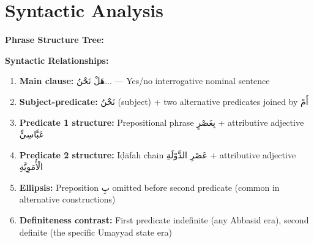 \documentclass[letterpaper,12pt]{article}
\begin{document}
\section{Syntactic Analysis}

\begin{tcolorbox}[colback=white,colframe=accentcolor,breakable]
\textbf{Phrase Structure Tree:}

\begin{center}
\end{center}

\vspace{1em}
\textbf{Syntactic Relationships:}
\begin{enumerate}
\item \textbf{Main clause:} \textarabic{هَلْ نَحْنُ...} — Yes/no interrogative nominal sentence
\item \textbf{Subject-predicate:} \textarabic{نَحْنُ} (subject) + two alternative predicates joined by \textarabic{أَمْ}
\item \textbf{Predicate 1 structure:} Prepositional phrase \textarabic{بِعَصْرٍ} + attributive adjective \textarabic{عَبَّاسِيٍّ}
\item \textbf{Predicate 2 structure:} Iḍāfah chain \textarabic{عَصْرِ الدَّوْلَةِ} + attributive adjective \textarabic{الْأُمَوِيَّةِ}
\item \textbf{Ellipsis:} Preposition \textarabic{بِ} omitted before second predicate (common in alternative constructions)
\item \textbf{Definiteness contrast:} First predicate indefinite (any Abbasid era), second definite (the specific Umayyad state era)
\end{enumerate}


\end{tcolorbox}
\end{document}
